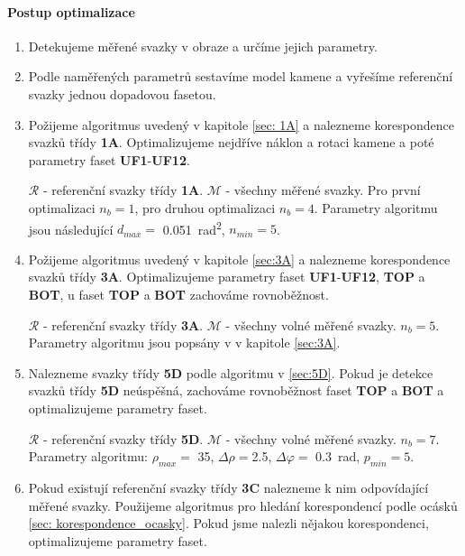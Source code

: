 \paragraph{Postup optimalizace}
\begin{enumerate}
\item Detekujeme měřené svazky v obraze a určíme jejich parametry. 

\item Podle naměřených parametrů sestavíme model kamene a vyřešíme referenční svazky jednou dopadovou fasetou. 

\item Požijeme algoritmus uvedený v kapitole \ref{sec: 1A} a  nalezneme korespondence svazků třídy \textbf{1A}. Optimalizujeme nejdříve náklon a rotaci kamene a poté parametry faset \textbf{UF1}-\textbf{UF12}.

$\mathcal{R}$ - referenční svazky třídy \textbf{1A}. $\mathcal{M}$ - všechny měřené svazky. Pro první optimalizaci $n_b= 1$, pro druhou optimalizaci $n_b= 4$. Parametry algoritmu jsou následující $d_{max} =  $ \SI{0.051}{\radian^2}, $n_{min} = 5$.

\item Požijeme algoritmus uvedený v kapitole \ref{sec:3A} a  nalezneme korespondence svazků třídy \textbf{3A}. Optimalizujeme parametry faset \textbf{UF1}-\textbf{UF12}, \textbf{TOP} a \textbf{BOT}, u faset \textbf{TOP} a \textbf{BOT} zachováme rovnoběžnost. 

$\mathcal{R}$ - referenční svazky třídy \textbf{3A}. $\mathcal{M}$ - všechny volné měřené svazky. $n_b= 5$. Parametry algoritmu jsou popsány v  v kapitole \ref{sec:3A}.

\item Nalezneme svazky třídy \textbf{5D} podle algoritmu v \ref{sec:5D}. Pokud je detekce svazků třídy \textbf{5D} neúspěšná, zachováme rovnoběžnost faset \textbf{TOP} a \textbf{BOT} a optimalizujeme parametry faset.

$\mathcal{R}$ - referenční svazky třídy \textbf{5D}. $\mathcal{M}$ - všechny volné měřené svazky. $n_b= 7$. Parametry algoritmu: $\rho_{max} = $ \SI{35}{\px}, $\Delta\rho = $\SI{2.5}{\px},  $\Delta\varphi = $ \SI{0.3}{\radian},   $p_{min} = 5 $.

\item Pokud existují referenční svazky třídy \textbf{3C} nalezneme k nim odpovídající měřené svazky. Použijeme algoritmus pro hledání korespondencí podle ocásků \ref{sec: korespondence_ocasky}. Pokud jsme nalezli nějakou korespondenci, optimalizujeme parametry faset.


\end{enumerate}
